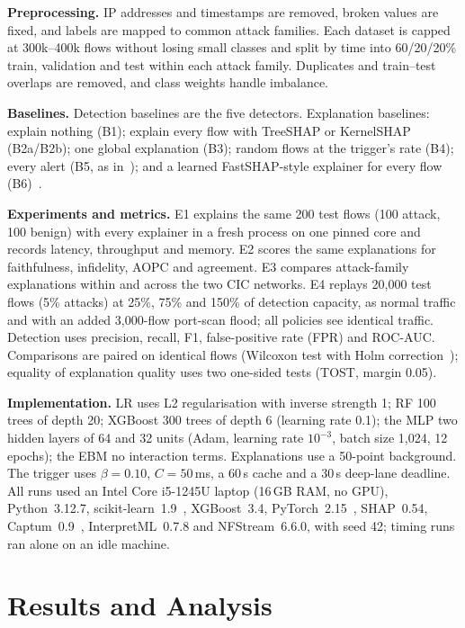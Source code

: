 \documentclass[pdflatex,iicol,sn-mathphys-num]{sn-jnl}
\begin{document}
\textbf{Preprocessing.} IP addresses and timestamps are removed, broken values are fixed, and labels are mapped to common attack families. Each dataset is capped at 300k--400k flows without losing small classes and split by time into 60/20/20\% train, validation and test within each attack family. Duplicates and train--test overlaps are removed, and class weights handle imbalance.

\textbf{Baselines.} Detection baselines are the five detectors. Explanation baselines: explain nothing (B1); explain every flow with TreeSHAP or KernelSHAP (B2a/B2b); one global explanation (B3); random flows at the trigger's rate (B4); every alert (B5, as in~\cite{p8}); and a learned FastSHAP-style explainer for every flow (B6)~\cite{fastshap}.

\textbf{Experiments and metrics.} E1 explains the same 200 test flows (100 attack, 100 benign) with every explainer in a fresh process on one pinned core and records latency, throughput and memory. E2 scores the same explanations for faithfulness, infidelity, AOPC and agreement. E3 compares attack-family explanations within and across the two CIC networks. E4 replays 20{,}000 test flows (5\% attacks) at 25\%, 75\% and 150\% of detection capacity, as normal traffic and with an added 3{,}000-flow port-scan flood; all policies see identical traffic. Detection uses precision, recall, F1, false-positive rate (FPR) and ROC-AUC. Comparisons are paired on identical flows (Wilcoxon test with Holm correction~\cite{demsar2006}); equality of explanation quality uses two one-sided tests (TOST, margin 0.05).

\textbf{Implementation.} LR uses L2 regularisation with inverse strength 1; RF 100 trees of depth 20; XGBoost 300 trees of depth 6 (learning rate 0.1); the MLP two hidden layers of 64 and 32 units (Adam, learning rate $10^{-3}$, batch size 1{,}024, 12 epochs); the EBM no interaction terms. Explanations use a 50-point background. The trigger uses $\beta=0.10$, $C=50$\,ms, a 60\,s cache and a 30\,s deep-lane deadline. All runs used an Intel Core i5-1245U laptop (16\,GB RAM, no GPU), Python~3.12.7, scikit-learn~1.9~\cite{pedregosa2011}, XGBoost~3.4, PyTorch~2.15~\cite{paszke2019}, SHAP~0.54, Captum~0.9~\cite{kokhlikyan2020}, InterpretML~0.7.8 and NFStream~6.6.0, with seed 42; timing runs ran alone on an idle machine.

\section{Results and Analysis}\label{sec:results}
\end{document}
